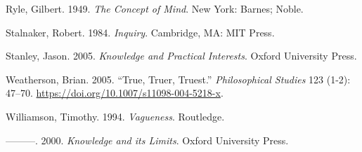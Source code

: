 \documentclass[
  11pt,
  letterpaper,
  DIV=11,
  numbers=noendperiod,
  oneside]{scrartcl}
\newlength{\cslhangindent}
\newenvironment{CSLReferences}[2] %
 {\begin{list}{}{%
  \setlength{\itemindent}{0pt}
  \setlength{\leftmargin}{0pt}
  \setlength{\parsep}{0pt}
  \ifodd #1
   \setlength{\leftmargin}{\cslhangindent}
   \setlength{\itemindent}{-1\cslhangindent}
  \fi
  \setlength{\itemsep}{#2\baselineskip}}}
 {\end{list}}
\begin{document}
\begin{CSLReferences}{1}{0}
Ryle, Gilbert. 1949. \emph{The Concept of Mind}. New York: Barnes;
Noble.

Stalnaker, Robert. 1984. \emph{Inquiry}. Cambridge, MA: MIT Press.

Stanley, Jason. 2005. \emph{{Knowledge and Practical Interests}}. Oxford
University Press.

Weatherson, Brian. 2005. {``{True, Truer, Truest}.''}
\emph{Philosophical Studies} 123 (1-2): 47--70.
\url{https://doi.org/10.1007/s11098-004-5218-x}.

Williamson, Timothy. 1994. \emph{{Vagueness}}. Routledge.

---------. 2000. \emph{{Knowledge and its Limits}}. Oxford University
Press.

\end{CSLReferences}
\end{document}
